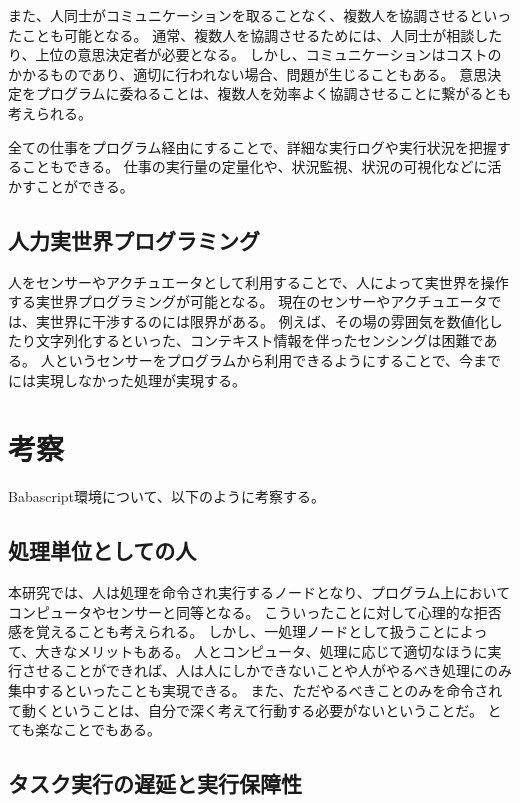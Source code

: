 また、人同士がコミュニケーションを取ることなく、複数人を協調させるといったことも可能となる。
通常、複数人を協調させるためには、人同士が相談したり、上位の意思決定者が必要となる。
しかし、コミュニケーションはコストのかかるものであり、適切に行われない場合、問題が生じることもある。
意思決定をプログラムに委ねることは、複数人を効率よく協調させることに繋がるとも考えられる。

全ての仕事をプログラム経由にすることで、詳細な実行ログや実行状況を把握することもできる。
仕事の実行量の定量化や、状況監視、状況の可視化などに活かすことができる。

\subsection{人力実世界プログラミング}\label{ux4ebaux529bux5b9fux4e16ux754cux30d7ux30edux30b0ux30e9ux30dfux30f3ux30b0}

人をセンサーやアクチュエータとして利用することで、人によって実世界を操作する実世界プログラミングが可能となる。
現在のセンサーやアクチュエータでは、実世界に干渉するのには限界がある。
例えば、その場の雰囲気を数値化したり文字列化するといった、コンテキスト情報を伴ったセンシングは困難である。
人というセンサーをプログラムから利用できるようにすることで、今までには実現しなかった処理が実現する。

\section{考察}\label{ux8003ux5bdf}

Babascript環境について、以下のように考察する。

\subsection{処理単位としての人}\label{ux51e6ux7406ux5358ux4f4dux3068ux3057ux3066ux306eux4eba}

本研究では、人は処理を命令され実行するノードとなり、プログラム上においてコンピュータやセンサーと同等となる。
こういったことに対して心理的な拒否感を覚えることも考えられる。
しかし、一処理ノードとして扱うことによって、大きなメリットもある。
人とコンピュータ、処理に応じて適切なほうに実行させることができれば、人は人にしかできないことや人がやるべき処理にのみ集中するといったことも実現できる。
また、ただやるべきことのみを命令されて動くということは、自分で深く考えて行動する必要がないということだ。
とても楽なことでもある。

\subsection{タスク実行の遅延と実行保障性}\label{ux30bfux30b9ux30afux5b9fux884cux306eux9045ux5ef6ux3068ux5b9fux884cux4fddux969cux6027}

